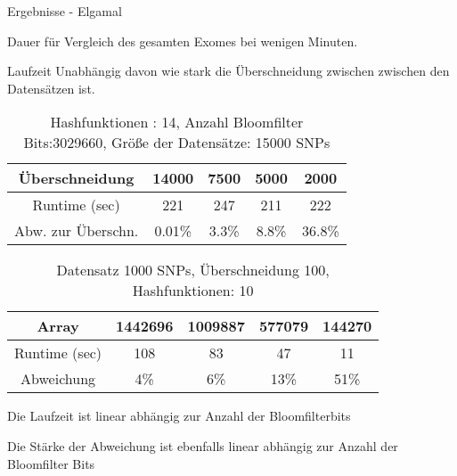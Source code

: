 \documentclass{beamer}
\begin{document}
\begin{frame}{Ergebnisse - Elgamal }
	
	\begin{arrowlist}
		\item Dauer für Vergleich des gesamten Exomes bei wenigen Minuten.
		\item Laufzeit Unabhängig davon wie stark die Überschneidung zwischen zwischen den Datensätzen ist. 
	\end{arrowlist}

 \begin{table}[h]
	\begin{tabular}{c|c|c|c|c}
		Überschneidung&14000&7500&5000&2000\\
		\hline
		Runtime (sec)& 221&247&211&222\\
		Abw. zur Überschn.& 0.01\%& 3.3\%&8.8\%&36.8\%\\
			 		
	\end{tabular}
	\caption{Hashfunktionen : 14, Anzahl Bloomfilter Bits:3029660, Größe der Datensätze: 15000 SNPs }
	\label{tab:meinetabelle1}
	
	
\end{table}


\end{frame}	
\begin{frame}
\begin{table}[h]
			 	
	\begin{tabular}{c|c|c|c|c}
	    Array& 1442696&1009887&577079&144270\\
	    \hline
		Runtime (sec)& 108&83&47&11\\
		Abweichung&4\%&6\%&13\%&51\%\\

			 		
	\end{tabular}
	\caption{Datensatz 1000 SNPs, Überschneidung 100, Hashfunktionen: 10 }
	\label{tab:meinetabelle2}
\end{table}

\begin{arrowlist}
	\item Die Laufzeit ist linear abhängig zur Anzahl der Bloomfilterbits
	\item Die Stärke der Abweichung ist ebenfalls linear abhängig zur Anzahl der Bloomfilter Bits
\end{arrowlist}
\end{frame}			 
	
\end{document}
